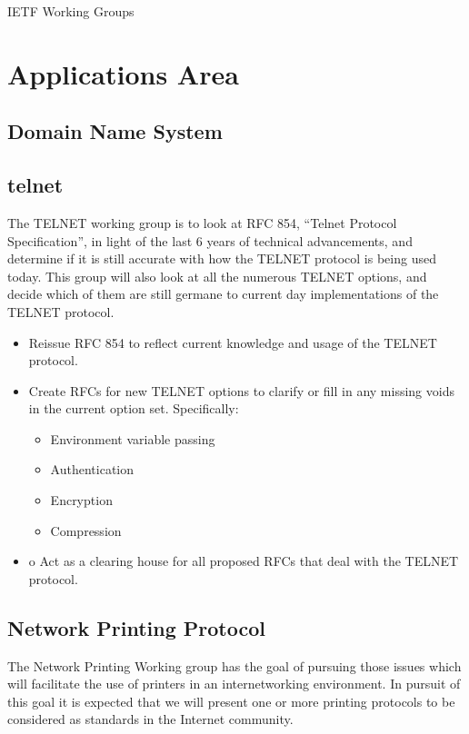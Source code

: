 \begin{center}
{\Large IETF Working Groups}
\end{center}

\section{ Applications Area}

\subsection{Domain Name System}

\subsection{ 
telnet
}
The TELNET working group is to look at RFC 854, ``Telnet Protocol
Specification'', in light of the last 6 years of technical
advancements, and determine if it is still accurate with how the
TELNET protocol is being used today.  This group will also look at all
the numerous TELNET options, and decide which of them are still
germane to current day implementations of the TELNET protocol.

\begin{itemize}
\item
   Reissue RFC 854 to reflect current knowledge and usage of the
     TELNET protocol.
\item
   Create RFCs for new TELNET options to clarify or fill in any
     missing voids in the current option set.  Specifically:

\begin{itemize}
\item  Environment variable passing
\item  Authentication
\item  Encryption
\item  Compression
\end{itemize}

\item
   o Act as a clearing house for all proposed RFCs that deal with the
     TELNET protocol.

\end{itemize}

\subsection{Network Printing Protocol
}
The Network Printing Working group has the goal of pursuing those
issues which will facilitate the use of printers in an internetworking
environment.  In pursuit of this goal it is expected that we will
present one or more printing protocols to be considered as standards
in the Internet community.


